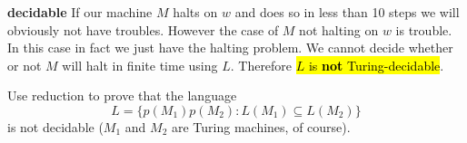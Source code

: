 \documentclass[12pt]{jhwhw}
\newcommand{\hlred}[1]{{\sethlcolor{pink}\hl{#1}}}
\begin{document}
	\bigbreak
	\textbf{decidable}
		If our machine $M$ halts on $w$ and does so in less than 10 steps we will obviously not have troubles.
		However the case of $M$ not halting on $w$ is trouble. In this case in fact we just have the halting problem.
		We cannot decide whether or not $M$ will halt in finite time using $L$. Therefore \hlred{$L$ is \textbf{not}
		Turing-decidable}.

\problem{}

	Use reduction to prove that the language 
	$$
		L = \{p(M_1)p(M_2): L(M_1) \subseteq L(M_2)\}
	$$
	is not decidable ($M_1$ and $M_2$ are Turing machines, of course).

\solution
\end{document}
